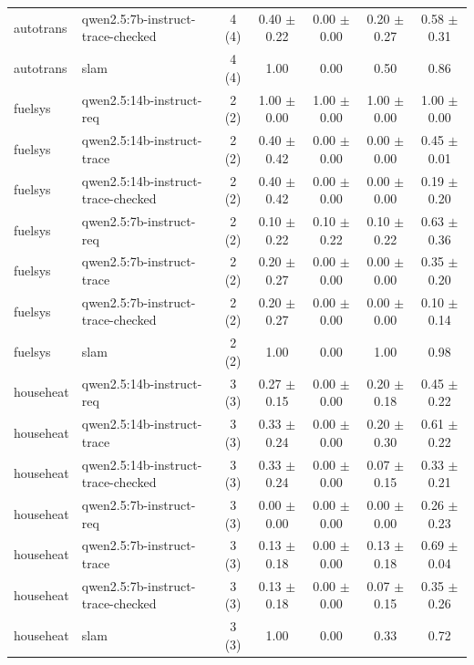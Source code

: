 \begin{tabular}{llccccc}
autotrans & qwen2.5:7b-instruct-trace-checked & 4 (4) & 0.40 $\pm$ 0.22 & 0.00 $\pm$ 0.00 & 0.20 $\pm$ 0.27 & 0.58 $\pm$ 0.31 \\
autotrans & slam & 4 (4) & 1.00 & 0.00 & 0.50 & 0.86 \\
fuelsys & qwen2.5:14b-instruct-req & 2 (2) & 1.00 $\pm$ 0.00 & 1.00 $\pm$ 0.00 & 1.00 $\pm$ 0.00 & 1.00 $\pm$ 0.00 \\
fuelsys & qwen2.5:14b-instruct-trace & 2 (2) & 0.40 $\pm$ 0.42 & 0.00 $\pm$ 0.00 & 0.00 $\pm$ 0.00 & 0.45 $\pm$ 0.01 \\
fuelsys & qwen2.5:14b-instruct-trace-checked & 2 (2) & 0.40 $\pm$ 0.42 & 0.00 $\pm$ 0.00 & 0.00 $\pm$ 0.00 & 0.19 $\pm$ 0.20 \\
fuelsys & qwen2.5:7b-instruct-req & 2 (2) & 0.10 $\pm$ 0.22 & 0.10 $\pm$ 0.22 & 0.10 $\pm$ 0.22 & 0.63 $\pm$ 0.36 \\
fuelsys & qwen2.5:7b-instruct-trace & 2 (2) & 0.20 $\pm$ 0.27 & 0.00 $\pm$ 0.00 & 0.00 $\pm$ 0.00 & 0.35 $\pm$ 0.20 \\
fuelsys & qwen2.5:7b-instruct-trace-checked & 2 (2) & 0.20 $\pm$ 0.27 & 0.00 $\pm$ 0.00 & 0.00 $\pm$ 0.00 & 0.10 $\pm$ 0.14 \\
fuelsys & slam & 2 (2) & 1.00 & 0.00 & 1.00 & 0.98 \\
househeat & qwen2.5:14b-instruct-req & 3 (3) & 0.27 $\pm$ 0.15 & 0.00 $\pm$ 0.00 & 0.20 $\pm$ 0.18 & 0.45 $\pm$ 0.22 \\
househeat & qwen2.5:14b-instruct-trace & 3 (3) & 0.33 $\pm$ 0.24 & 0.00 $\pm$ 0.00 & 0.20 $\pm$ 0.30 & 0.61 $\pm$ 0.22 \\
househeat & qwen2.5:14b-instruct-trace-checked & 3 (3) & 0.33 $\pm$ 0.24 & 0.00 $\pm$ 0.00 & 0.07 $\pm$ 0.15 & 0.33 $\pm$ 0.21 \\
househeat & qwen2.5:7b-instruct-req & 3 (3) & 0.00 $\pm$ 0.00 & 0.00 $\pm$ 0.00 & 0.00 $\pm$ 0.00 & 0.26 $\pm$ 0.23 \\
househeat & qwen2.5:7b-instruct-trace & 3 (3) & 0.13 $\pm$ 0.18 & 0.00 $\pm$ 0.00 & 0.13 $\pm$ 0.18 & 0.69 $\pm$ 0.04 \\
househeat & qwen2.5:7b-instruct-trace-checked & 3 (3) & 0.13 $\pm$ 0.18 & 0.00 $\pm$ 0.00 & 0.07 $\pm$ 0.15 & 0.35 $\pm$ 0.26 \\
househeat & slam & 3 (3) & 1.00 & 0.00 & 0.33 & 0.72 \\
\bottomrule
\end{tabular}
